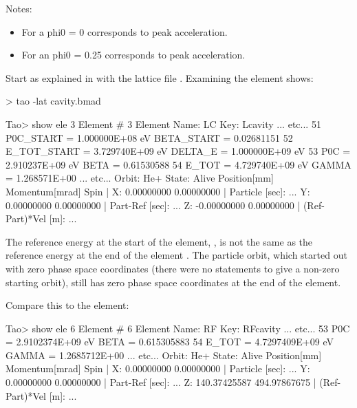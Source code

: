\documentclass{hitec}     %
\begin{document}
{Notes:
\vspace{-5 pt}
\begin{itemize}
\item For a  phi0 = 0 corresponds to peak acceleration.
\item For an  phi0 = 0.25 corresponds to peak acceleration.
\end{itemize}

Start \tao as explained in with the lattice file
. Examining the  element shows:
\begin{code}
> tao -lat cavity.bmad

Tao> show ele 3
Element #                3
Element Name: LC
Key: Lcavity
... etc...
   51   P0C_START    =  1.000000E+08 eV        BETA_START   =  0.02681151
   52   E_TOT_START  =  3.729740E+09 eV        DELTA_E      =  1.000000E+09 eV
   53   P0C          =  2.910237E+09 eV        BETA         =  0.61530588
   54   E_TOT        =  4.729740E+09 eV        GAMMA        =  1.268571E+00
... etc...    
Orbit:  He+   State: Alive
         Position[mm] Momentum[mrad]        Spin   |
  X:       0.00000000     0.00000000               | Particle [sec]:     ...
  Y:       0.00000000     0.00000000               | Part-Ref [sec]:     ...
  Z:      -0.00000000     0.00000000               | (Ref-Part)*Vel [m]: ...
\end{code}

The reference energy at the start of the element, , is not the same as the reference
energy at the end of the element . The particle orbit, which started out with zero phase
space coordinates (there were no  statements to give a non-zero starting orbit), still
has zero phase space coordinates at the end of the  element.


Compare this to the  element:
\begin{code}
Tao> show ele 6
Element #                6
Element Name: RF
Key: RFcavity
... etc...
   53   P0C         =  2.9102374E+09 eV         BETA      =  0.615305883
   54   E_TOT       =  4.7297409E+09 eV         GAMMA     =  1.2685712E+00
... etc...
 Orbit:  He+   State: Alive
         Position[mm] Momentum[mrad]        Spin   |
  X:       0.00000000     0.00000000               | Particle [sec]:     ...
  Y:       0.00000000     0.00000000               | Part-Ref [sec]:     ...
  Z:     140.37425587   494.97867675               | (Ref-Part)*Vel [m]: ...
\end{code}

}
\end{document}
